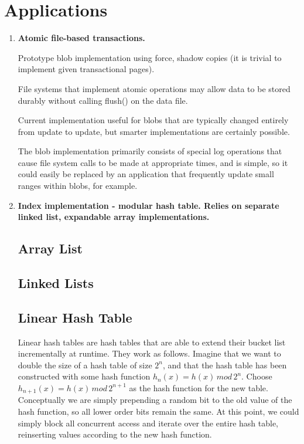 \documentclass[letterpaper,english]{article}
\begin{document}
\section{Applications}

\begin{enumerate}

  \item {\bf Atomic file-based transactions. 
    
    Prototype blob implementation  using force, shadow copies (it is trivial to implement given transactional
  pages).  

  File systems that implement atomic operations may allow
  data to be stored durably without calling flush() on the data
  file. 

  Current implementation useful for blobs that are typically
  changed entirely from update to update, but smarter implementations
  are certainly possible. 

  The blob implementation primarily consists
  of special log operations that cause file system calls to be made at
  appropriate times, and is simple, so it could easily be replaced by
  an application that frequently update small ranges within blobs, for
  example.}

  \item {\bf Index implementation - modular hash table. Relies on separate
  linked list, expandable array implementations.}

\subsection{Array List}
\subsection{Linked Lists}

\subsection{Linear Hash Table\label{sub:Linear-Hash-Table}}

Linear hash tables are hash tables that are able to extend their bucket
list incrementally at runtime. They work as follows. Imagine that
we want to double the size of a hash table of size $2^{n}$, and that
the hash table has been constructed with some hash function $h_{n}(x)=h(x)\, mod\,2^{n}$.
Choose $h_{n+1}(x)=h(x)\, mod\,2^{n+1}$ as the hash function for
the new table. Conceptually we are simply prepending a random bit
to the old value of the hash function, so all lower order bits remain
the same. At this point, we could simply block all concurrent access
and iterate over the entire hash table, reinserting values according
to the new hash function. 


\end{enumerate}
\end{document}
